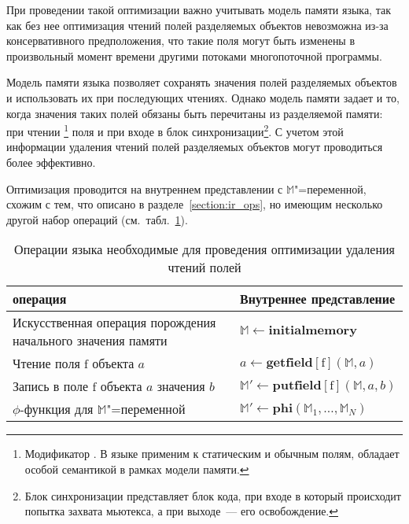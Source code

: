 \documentclass[14pt,titlepage,draft]{extarticle}
\newcommand{\java}{\eng{Java}\xspace}
\newcommand{\M}{\ensuremath{\mathbb{M}}}
\let\mathphi\phi
\renewcommand{\phi}{\ensuremath{\mathphi}}
\newcommand{\field}[1]{\mathrm{#1}}
\newcommand{\op}[1]{\mathbf{#1}}
\begin{document}
    При проведении такой оптимизации важно учитывать модель памяти языка, так
    как без нее оптимизация чтений полей разделяемых объектов невозможна из-за
    консервативного предположения, что такие поля могут быть изменены в
    произвольный момент времени другими потоками многопоточной программы.

    Модель памяти языка \java позволяет сохранять значения полей
    разделяемых объектов и использовать их при последующих чтениях.
    Однако модель памяти задает и то, когда значения таких полей обязаны
    быть перечитаны из разделяемой памяти: при чтении
    \footnote{
      Модификатор . В языке \java применим к статическим и
      обычным полям, обладает особой семантикой в рамках модели памяти.
    } поля и при входе в блок синхронизации\footnote{
      Блок синхронизации представляет блок кода, при входе в который происходит
      попытка захвата мьютекса, а при выходе~--- его освобождение.
    }.
    С учетом этой информации удаления чтений полей разделяемых объектов могут
    проводиться более эффективно.

    Оптимизация проводится на внутреннем представлении с \M"=переменной,
    схожим с тем, что описано в разделе~\ref{section:ir_ops}, но имеющим
    несколько другой набор операций
    (см.~табл.~\ref{tabular:read_elimination_operations}).

    \begin{table}[htb]
      \centering

      \begin{tabular}{|p{}|p{}|}\hline
        \textbf{\java операция} &
          \textbf{Внутреннее представление}\\ \hline

        Искусственная операция порождения начального значения памяти
        & $\M \gets \op{initialmemory}$
        \\ \hline

        Чтение поля $\field{f}$ объекта $a$
        & $a \gets \op{getfield}[\field{f}](\M, a)$
        \\ \hline

        Запись в поле $\field{f}$ объекта $a$ значения $b$
        & $\M' \gets \op{putfield}[\field{f}](\M, a, b)$
        \\ \hline

        \phi-функция для \M"=переменной
        & $\M' \gets \op{phi}(\M_1, \ldots, \M_N)$
        \\ \hline

      \end{tabular}
      \caption{Операции языка \java необходимые для проведения оптимизации
               удаления чтений полей}
      \label{tabular:read_elimination_operations}
    \end{table}
\end{document}
